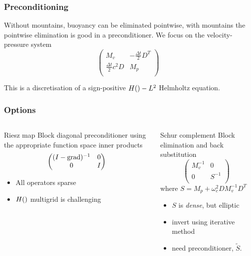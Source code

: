\documentclass[presentation]{beamer}
\DeclareMathOperator{\grad}{grad}
\let\div\relax
\DeclareMathOperator{\div}{div}
\begin{document}
\begin{frame}
  \frametitle{Preconditioning}
  Without mountains, buoyancy can be eliminated pointwise, with
  mountains the pointwise elimination is good in a preconditioner.  We
  focus on the velocity-pressure system
\begin{equation*}
\begin{pmatrix}
  M_v & -\frac{\Delta t}{2}D^T\\
  \frac{\Delta t}{2}c^2D & M_p\\
\end{pmatrix}
\end{equation*}

This is a discretisation of a sign-positive $H(\div)-L^2$ Helmholtz
equation.
\end{frame}

\begin{frame}[t]
  \frametitle{Options}
  \begin{columns}
    \begin{column}{0.5\textwidth}
      \begin{block}{Riesz map}
        Block diagonal preconditioner using the appropriate function
        space inner products
        \begin{equation*}
          \begin{pmatrix}
            (I - \grad \div)^{-1} & 0 \\
            0 & I\\
          \end{pmatrix}
        \end{equation*}
      \end{block}
      \begin{itemize}
      \item All operators sparse
      \item $H(\div)$ multigrid \parencite{Arnold:2000} is challenging
      \end{itemize}
    \end{column}
    \begin{column}{0.5\textwidth}
      \begin{block}{Schur complement}
        Block elimination and back substitution
        \begin{equation*}
          \begin{pmatrix}
            M_v^{-1} & 0 \\
            0 & S^{-1}\\
          \end{pmatrix}
        \end{equation*}
        where $S = M_p + \omega_c^2 D M_v^{-1} D^T$
      \end{block}
      \begin{itemize}
      \item $S$ is \emph{dense}, but elliptic
      \item invert using iterative method
      \item need preconditioner, $\tilde{S}$.
      \end{itemize}
    \end{column}
  \end{columns}
\end{frame}
\end{document}
